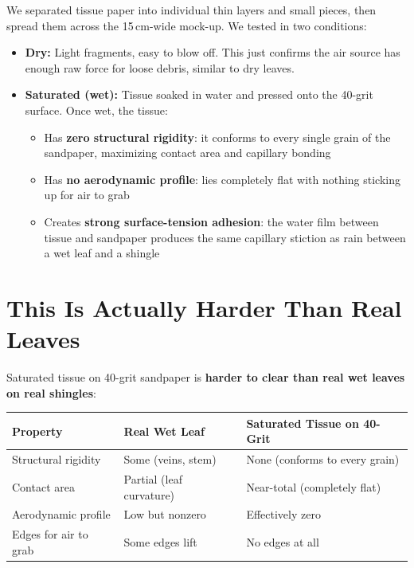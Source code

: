 \documentclass[12pt, letterpaper]{article}
\begin{document}
We separated tissue paper into individual thin layers and small pieces, then spread them across the 15\,cm-wide mock-up. We tested in two conditions:

\begin{itemize}
    \item \textbf{Dry:} Light fragments, easy to blow off. This just confirms the air source has enough raw force for loose debris, similar to dry leaves.
    \item \textbf{Saturated (wet):} Tissue soaked in water and pressed onto the 40-grit surface. Once wet, the tissue:
    \begin{itemize}
        \item Has \textbf{zero structural rigidity}: it conforms to every single grain of the sandpaper, maximizing contact area and capillary bonding
        \item Has \textbf{no aerodynamic profile}: lies completely flat with nothing sticking up for air to grab
        \item Creates \textbf{strong surface-tension adhesion}: the water film between tissue and sandpaper produces the same capillary stiction as rain between a wet leaf and a shingle
    \end{itemize}
\end{itemize}

\section{This Is Actually Harder Than Real Leaves}

Saturated tissue on 40-grit sandpaper is \textbf{harder to clear than real wet leaves on real shingles}:

\begin{table}[h]
\centering\small
\begin{tabular}{@{}lll@{}}
\toprule
\textbf{Property} & \textbf{Real Wet Leaf} & \textbf{Saturated Tissue on 40-Grit} \\
\midrule
Structural rigidity & Some (veins, stem) & None (conforms to every grain) \\
Contact area & Partial (leaf curvature) & Near-total (completely flat) \\
Aerodynamic profile & Low but nonzero & Effectively zero \\
Edges for air to grab & Some edges lift & No edges at all \\
\bottomrule
\end{tabular}
\end{table}
\end{document}
